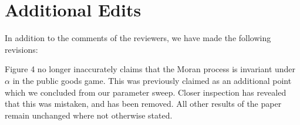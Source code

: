 \documentclass[11pt]{article}
\begin{document}


\section*{Additional Edits}

In addition to the comments of the reviewers, we have made the following
revisions:

Figure 4 no longer inaccurately claims that the Moran process is invariant under
\(\alpha\) in the public goods game. This was previously claimed as an
additional point which we concluded from our parameter sweep. Closer inspection
has revealed that this was mistaken, and has been removed. All other results of
the paper remain unchanged where not otherwise stated.
\end{document}
